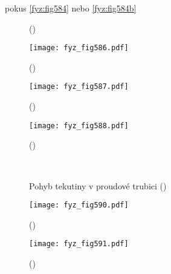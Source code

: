     pokus \ref{fyz:fig584} nebo \ref{fyz:fig584b}
    
    \begin{figure}[ht!]
      \centering
      \label{fyz:fig585}
      \caption{
               (\cite[s.~748]{Feynman02})}
    \end{figure}

    \begin{figure}[ht!] %
      \centering
      \texttt{[image: fyz\_fig586.pdf]}
      \caption{
               (\cite[s.~707]{Feynman02})}
      \label{fyz:fig586}
    \end{figure}
    
    \begin{figure}[ht!] %
      \centering
      \texttt{[image: fyz\_fig587.pdf]}
      \caption{
               (\cite[s.~707]{Feynman02})}
      \label{fyz:fig587}
    \end{figure}

    \begin{figure}[ht!] %
      \centering
      \texttt{[image: fyz\_fig588.pdf]}
      \caption{
               (\cite[s.~707]{Feynman02})}
      \label{fyz:fig588}
    \end{figure}

    \begin{figure}[ht!]
      \centering
                     \\
      \caption{Pohyb tekutiny v proudové trubici
               (\cite[s.~748]{Feynman02})}
    \end{figure}

    \begin{figure}[ht!] %
      \centering
      \texttt{[image: fyz\_fig590.pdf]}
      \caption{
               (\cite[s.~707]{Feynman02})}
      \label{fyz:fig590}
    \end{figure}
    
    \begin{figure}[ht!] %
      \centering
      \texttt{[image: fyz\_fig591.pdf]}
      \caption{
               (\cite[s.~707]{Feynman02})}
      \label{fyz:fig591}
    \end{figure}

